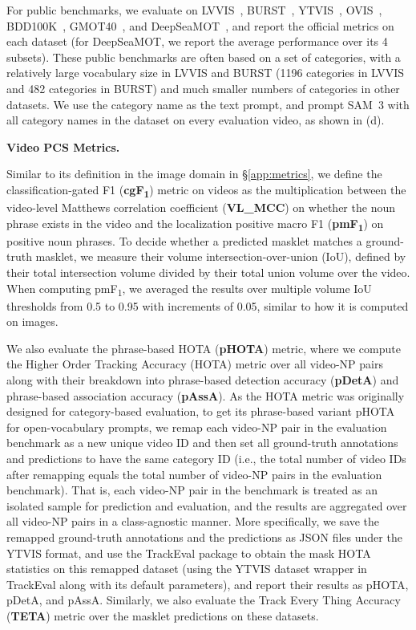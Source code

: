 \documentclass[]{fairmeta}
\newcommand{\model}{SAM~3\xspace}
\newcommand{\cgf}{cgF\textsubscript{1}\xspace}
\newcommand{\pmf}{pmF\textsubscript{1}\xspace}
\newcommand{\vlmcc}{VL\_MCC\xspace}
\renewcommand{\paragraph}[1]{%
	\noindent\textbf{#1.}\noindent\xspace%
}
\begin{document}
		For public benchmarks, we evaluate on LVVIS~\citep{wang2023towards}, BURST~\citep{athar2023burst}, YTVIS~\citep{ke2022video}, OVIS~\citep{qi2022occluded}, BDD100K~\citep{bdd100k}, GMOT40~\citep{bai2021gmot}, and DeepSeaMOT~\citep{barnard2025deepseamot}, and report the official metrics on each dataset (for DeepSeaMOT, we report the average performance over its 4 subsets). These public benchmarks are often based on a set of categories, with a relatively large vocabulary size in LVVIS and BURST (1196 categories in LVVIS and 482 categories in BURST) and much smaller numbers of categories in other datasets. We use the category name as the text prompt, and prompt \model with all category names in the dataset on every evaluation video, as shown in  (d).
		
		\paragraph{Video PCS Metrics}
		Similar to its definition in the image domain in \S\ref{app:metrics}, we define the classification-gated F1 (\textbf{\cgf}) metric on videos as the multiplication between the video-level Matthews correlation coefficient (\textbf{\vlmcc}) on whether the noun phrase exists in the video and the localization positive macro F1 (\textbf{\pmf}) on positive noun phrases. To decide whether a predicted masklet matches a ground-truth masklet, we measure their volume intersection-over-union (IoU), defined by their total intersection volume divided by their total union volume over the video. When computing \pmf, we averaged the results over multiple volume IoU thresholds from 0.5 to 0.95 with increments of 0.05, similar to how it is computed on images.
		
		We also evaluate the phrase-based HOTA (\textbf{pHOTA}) metric, where we compute the Higher Order Tracking Accuracy (HOTA) metric \citep{luiten2021hota} over all video-NP pairs along with their breakdown into phrase-based detection accuracy (\textbf{pDetA}) and phrase-based association accuracy (\textbf{pAssA}). As the HOTA metric was originally designed for category-based evaluation, to get its phrase-based variant pHOTA for open-vocabulary prompts, we remap each video-NP pair in the evaluation benchmark as a new unique video ID and then set all ground-truth annotations and predictions to have the same category ID (i.e., the total number of video IDs after remapping equals the total number of video-NP pairs in the evaluation benchmark). That is, each video-NP pair in the benchmark is treated as an isolated sample for prediction and evaluation, and the results are aggregated over all video-NP pairs in a class-agnostic manner. More specifically, we save the remapped ground-truth annotations and the predictions as JSON files under the YTVIS format, and use the TrackEval package \citep{luiten2020trackeval} to obtain the mask HOTA statistics on this remapped dataset (using the YTVIS dataset wrapper in TrackEval along with its default parameters), and report their results as pHOTA, pDetA, and pAssA. Similarly, we also evaluate the Track Every Thing Accuracy (\textbf{TETA}) metric \citep{li2022tracking} over the masklet predictions on these datasets.
		
\end{document}
